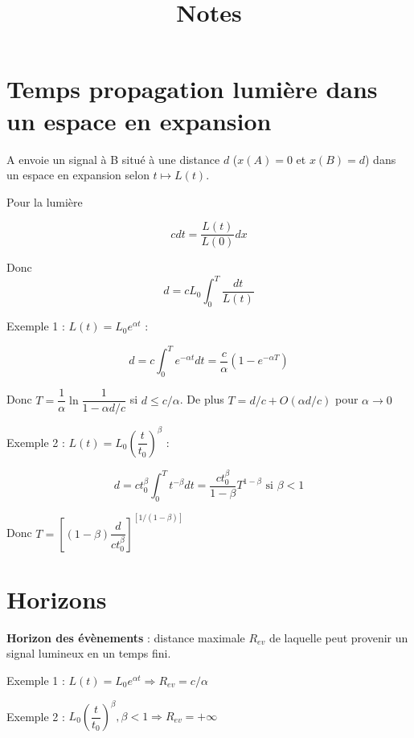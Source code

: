 \documentclass[11pt]{article} %
\title{Notes}
\author{}
\date{} %
\newcommand{\dint}{\displaystyle \int}
\begin{document}
\maketitle

\section{Temps propagation lumière dans un espace en expansion}

A envoie un signal à B situé à une distance $d$ ($x(A) = 0$ et $x(B) = d$) dans un espace en expansion selon $t \mapsto L(t)$. 

Pour la lumière

\begin{equation}
c dt = \dfrac{L(t)}{L(0)} dx
\end{equation}

Donc \begin{equation}
d = cL_0 \dint_0^T \dfrac{dt}{L(t)}
\end{equation}


Exemple 1 : $L(t) = L_0 e^{\alpha t}$ :

 \begin{equation}
d = c \dint_0^T e^{-\alpha t} dt = \dfrac{c}{\alpha} \left ( 1 - e^{-\alpha T} \right )
\end{equation}

Donc $T = \dfrac{1}{\alpha} \ln { \dfrac{1}{1-\alpha d/c}}$ si $d \leq c/\alpha$.
De plus $T = d/c + O(\alpha d/c)$ pour $\alpha \to 0$

Exemple 2 : $L(t) = L_0 \left ( \dfrac{t}{t_0} \right )^\beta$ :

 \begin{equation}
d = c t_0 ^\beta \dint_0^T t^{-\beta} dt = \dfrac{ct_0^\beta} {1-\beta}  T^{1-\beta}  \textrm{ si } \beta < 1
\end{equation}

Donc $T = \left [ (1-\beta) \dfrac{d}{ct_0^\beta} \right ] ^ { \left [1/(1-\beta)\right ] }$

\section{Horizons}

\textbf{Horizon des évènements} : distance maximale $R_{ev}$ de laquelle peut provenir un signal lumineux en un temps fini.

Exemple 1 : $L(t) = L_0 e^{\alpha t} \Rightarrow R_{ev} = c/\alpha$

Exemple 2 : $L_0 \left ( \dfrac{t}{t_0} \right )^\beta, \beta < 1 \Rightarrow R_{ev} = +\infty$
\end{document}
